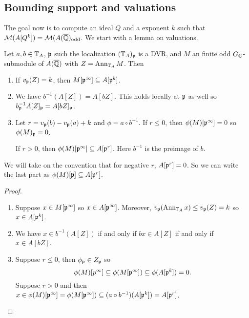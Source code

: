 \documentclass{article}
\newcommand{\odd}{\mathrm{odd}}
\begin{document}
\subsection{Bounding support and valuations}%
\label{sub:bounding_support_and_valuations} 

The goal now is to compute an ideal $Q$ and a exponent $k$ such that
$\M(A[Q^k]) = \M(A(\QQbar)_\odd$. We start with a lemma on valuations.

\begin{lemma}\label{lem:com_alg}
    Let $a,b\in \mathbb{T}_A$, $\mathfrak{p}$ such the localization $(\mathbb{T}_A)_{\mathfrak{p}}$ is a DVR, and
    $M$ an finite odd $G_{\mathbb{Q}}$-submodule of $A(\overline{\mathbb{Q}})$ with $Z=\operatorname{Ann}_{\mathbb{T}_A} M$.
    Then
    \begin{enumerate}
        \item 
            If $v_{\mathfrak{p}}(Z) = k$, then $M[\mathfrak{p}^\infty]\subseteq A[\mathfrak{p}^k]$.
        \item
            We have $b^{-1}(A[Z])=A[bZ]$. This holds locally at $\mathfrak{p}$ as well so
            $b_{\mathfrak{p}} ^{-1} A[Z]_{\mathfrak{p}} = A[bZ]_{\mathfrak{p}}$.
        \item
            Let $r=v_{\mathfrak{p}}(b)-v_{\mathfrak{p}}(a)+k$ and $\phi=a\circ b^{-1}$. If $r\leq
            0$, then $\phi(M)[\mathfrak{p}^\infty]=0$ so $\phi(M)_{\mathfrak{p}}=0$.
            
            If $r>0$, then
            $\phi(M)[\mathfrak{p}^\infty]\subseteq A[\mathfrak{p}^r]$. Here $b^{-1}$ is the
            preimage of $b$.
    \end{enumerate}
    We will take on the convention that for negative $r$, $A[\mathfrak{p}^r]=0$. So we can
    write the last part as $\phi(M)[\mathfrak{p}]\subseteq A[\mathfrak{p}^r]$.
\end{lemma}
\begin{proof}
    \mbox{}
    \begin{enumerate}
        \item 
            Suppose $x\in M[\mathfrak{p}^\infty]$ so $x\in A[\mathfrak{p}^\infty]$. Moreover,
            $v_{\mathfrak{p}}(\operatorname{Ann}_{\mathbb{T}_A} x) \leq v_{\mathfrak{p}}(Z) = k$ so $x\in A[\mathfrak{p}^k]$.
        \item
            We have $x\in b^{-1}(A[Z])$ if and only if $bx \in A[Z]$ if and
            only if $x\in A[bZ]$.
        \item
            Suppose $r\leq 0$, then $\phi_{\mathfrak{p}} \in Z_{\mathfrak{p}}$ so
            \[
                \phi(M)[p^\infty]\subseteq \phi(M[\mathfrak{p}^\infty])
                \subseteq \phi(A[\mathfrak{p}^k]) = 0.
            \]
            Suppose $r>0$ and then $x\in \phi(M)[\mathfrak{p}^\infty] =
            \phi(M[\mathfrak{p}^\infty])\subseteq (a\circ
            b^{-1})(A[\mathfrak{p}^k])=A[\mathfrak{p}^r]$.
    \end{enumerate}
\end{proof}
\end{document}
